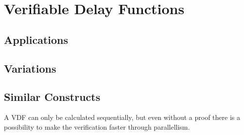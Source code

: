 \chapter{Verifiable Delay Functions}
\label{Verifiable Delay Functions}

\section{Applications}

\section{Variations}

\section{Similar Constructs}
A VDF can only be calculated sequentially, but even without a proof there is a possibility to make the verification faster through parallellism.\cite{yakovenko_solana_nodate} 


